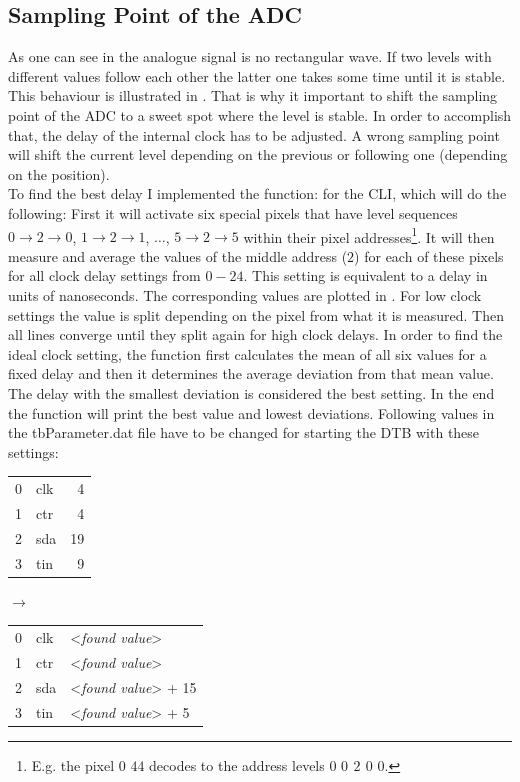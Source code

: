 \documentclass[british,11pt,a4paper]{memoir}
\begin{document}
\subsection{Sampling Point of the \ac{ADC}}
As one can see in  the analogue signal is no rectangular wave. If two levels with different values follow each other the latter one takes some time until it is stable. This behaviour is illustrated in . That is why it important to shift the sampling point of the \ac{ADC} to a sweet spot where the level is stable. In order to accomplish that, the delay of the internal clock has to be adjusted. A wrong sampling point will shift the current level depending on the previous or following one (depending on the position).\\
To find the best delay I implemented the function:
for the \ac{CLI}, which will do the following: First it will activate six special pixels that have level sequences $0\rightarrow 2 \rightarrow 0$, $1\rightarrow 2 \rightarrow 1$, $\hdots$, $5\rightarrow 2 \rightarrow 5$ within their pixel addresses\footnote{E.g. the pixel $0$ $44$ decodes to the address levels $0$ \textbf{$0$ $2$ $0$} $0$.}. It will then measure and average the values of the middle address ($2$) for each of these pixels for all clock delay settings from $0-24$. This setting is equivalent to a delay in units of nanoseconds. The corresponding values are plotted in . For low clock settings the value is split depending on the pixel from what it is measured. Then all lines converge until they split again for high clock delays. In order to find the ideal clock setting, the function first calculates the mean of all six values for a fixed delay and then it determines the average deviation from that mean value. The delay with the smallest deviation is considered the best setting. In the end the function will print the best value and lowest deviations. Following values in the tbParameter.dat file have to be changed for starting the \ac{DTB} with these settings:\s
{\ubuntu
\begin{tabular}{llr}
	0	&   clk	&  4\\
	1	&	ctr	&  4\\
	2	&	sda	&  19\\
	3	&	tin	&  9
\end{tabular}}
$\longrightarrow$
{\ubuntu
\begin{tabular}{lll}
	0	&   clk	&  <\textit{found value}>\\
	1	&	ctr	&  <\textit{found value}>\\
	2	&	sda	&  <\textit{found value}> + 15\\
	3	&	tin	&  <\textit{found value}> + 5
\end{tabular}}\no\s
\end{document}
